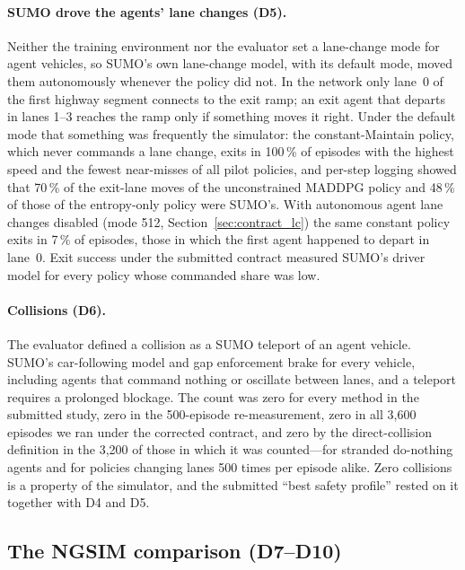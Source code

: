 \paragraph{SUMO drove the agents' lane changes (D5).}
Neither the training environment nor the evaluator set a lane-change mode for agent vehicles, so SUMO's own lane-change model, with its default mode, moved them autonomously whenever the policy did not. In the network only lane~0 of the first highway segment connects to the exit ramp; an exit agent that departs in lanes 1--3 reaches the ramp only if something moves it right. Under the default mode that something was frequently the simulator: the constant-Maintain policy, which never commands a lane change, exits in 100\,\% of episodes with the highest speed and the fewest near-misses of all pilot policies, and per-step logging showed that 70\,\% of the exit-lane moves of the unconstrained MADDPG policy and 48\,\% of those of the entropy-only policy were SUMO's. With autonomous agent lane changes disabled (mode 512, Section~\ref{sec:contract_lc}) the same constant policy exits in 7\,\% of episodes, those in which the first agent happened to depart in lane~0. Exit success under the submitted contract measured SUMO's driver model for every policy whose commanded share was low.

\paragraph{Collisions (D6).}
The evaluator defined a collision as a SUMO teleport of an agent vehicle. SUMO's car-following model and gap enforcement brake for every vehicle, including agents that command nothing or oscillate between lanes, and a teleport requires a prolonged blockage. The count was zero for every method in the submitted study, zero in the 500-episode re-measurement, zero in all 3{,}600 episodes we ran under the corrected contract, and zero by the direct-collision definition in the 3{,}200 of those in which it was counted---for stranded do-nothing agents and for policies changing lanes 500 times per episode alike. Zero collisions is a property of the simulator, and the submitted ``best safety profile'' rested on it together with D4 and D5.

\subsection{The NGSIM comparison (D7--D10)}
\label{sec:defects_ngsim}

